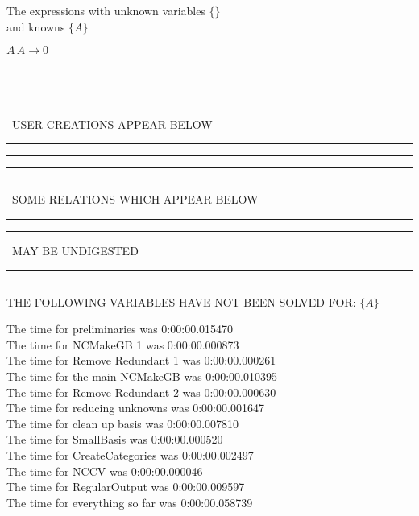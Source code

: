 \documentclass[rep10,leqno]{report}
\begin{document}
The expressions with unknown variables $\{\}$\\
and knowns $\{A\}$\smallskip\\
\begin{minipage}{6in}
$
A\,
 A\rightarrow 0
$
\end{minipage}\\
\rule[2pt]{6in}{1pt}\hfil\break
\rule[2.5pt]{1.701in}{1pt}
\ USER CREATIONS APPEAR BELOW\ 
\rule[2.5pt]{1.701in}{1pt}\hfil\break
\rule[2pt]{6in}{1pt}\hfil\break
\rule[2pt]{6in}{4pt}\hfil\break
\rule[2pt]{1.45in}{4pt}
\ SOME RELATIONS WHICH APPEAR BELOW\ 
\rule[2pt]{1.45in}{4pt}\hfil\break
\rule[2pt]{2.18in}{4pt}
\ MAY BE UNDIGESTED\ 
\rule[2pt]{2.18in}{4pt}\hfil\break
\rule[2pt]{6in}{4pt}\hfil\break
THE FOLLOWING VARIABLES HAVE NOT BEEN SOLVED FOR:\hfil\break
$\{A\}$
\smallskip\\
\vspace{10pt}

\noindent
The time for preliminaries was 0:00:00.015470\\
The time for NCMakeGB 1 was 0:00:00.000873\\
The time for Remove Redundant 1 was 0:00:00.000261\\
The time for the main NCMakeGB was 0:00:00.010395\\
The time for Remove Redundant 2 was 0:00:00.000630\\
The time for reducing unknowns was 0:00:00.001647\\
The time for clean up basis was 0:00:00.007810\\
The time for SmallBasis was 0:00:00.000520\\
The time for CreateCategories was 0:00:00.002497\\
The time for NCCV was 0:00:00.000046\\
The time for RegularOutput was 0:00:00.009597\\
The time for everything so far was 0:00:00.058739\\
\end{document}
